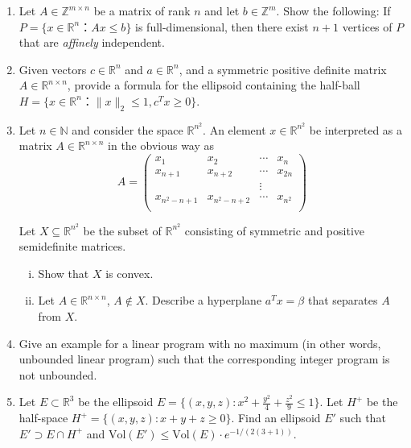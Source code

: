 \documentclass[11pt]{article}
\institute{\'Ecole Polytechnique F\'ed\'erale de Lausanne}
\DeclareMathOperator{\conv}{conv}
\newcommand{\setR}{\mathbb{R}}
\newcommand{\vol}{\mathrm{Vol}}
\begin{document}
\makeheader

\begin{enumerate}[1)]


    
\item Let $A ∈ ℤ^{m ×n}$ be a matrix of rank $n$ and let $b ∈ ℤ^m$. Show the following: If $P = \{ x ∈ ℝ^n ： Ax ≤ b\}$ is full-dimensional, then there exist $n+1$ vertices of $P$ that are \textit{affinely} independent. 


\item Given vectors $c∈\setR^n$ and $a∈\setR^n$, and a symmetric positive definite matrix $A∈\setR^{n×n}$, provide a formula for the ellipsoid containing the half-ball $H= \{x∈\setR^n ： ∥x∥_2 ≤1, c^Tx≥0\}$.
  
  
\item Let $n ∈ ℕ$ and consider the space $ℝ^{n^2}$. An element $x ∈ℝ^{n^2}$  be interpreted as a matrix $A ∈ ℝ^{n ×n}$  in the obvious way as
  \begin{displaymath}
    A =
    \begin{pmatrix}
      x_1 & x_2 & \cdots & x_n \\
      x_{n+1} & x_{n+2} & \cdots & x_{2n} \\
      & &  \vdots \\
      x_{n^2-n+1} & x_{n^2-n+2} & \cdots &x_{n^2} \\
    \end{pmatrix}
  \end{displaymath}

  Let  $X ⊆ ℝ^{n^2}$ be the subset of $ℝ^{n^2}$ consisting of symmetric and positive semidefinite matrices. 
  \begin{enumerate}[i)]
  \item Show that $X$ is convex.
  \item Let $A ∈ ℝ^{n ×n}$, $A ∉ X$. Describe a hyperplane $a^Tx = β$ that separates $A$ from $X$. 
  \end{enumerate}
  
\item Give an example for a linear program with no maximum (in other
words, unbounded linear program) such that the corresponding integer
program is not unbounded.


\item Let $E ⊂\setR^3$ be the ellipsoid
  $E= \{(x,y,z) :x^2 + \frac{y^2}{4} + \frac{z^2} {9} ≤1\}$.  Let
  $H^+$ be the half-space $H^+ = \{(x,y,z) : x+ y+ z ≥0\}$.  Find an
  ellipsoid $E'$ such that $E'⊃E∩H^+$ and
  $\vol(E') ≤\vol(E) ⋅e^{−1/(2(3+1))}$.



\end{enumerate}




  
\end{document}
